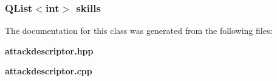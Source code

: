 \subsubsection{\setlength{\rightskip}{0pt plus 5cm}QList$<$int$>$ {\bf skills}}\label{classAttackDescriptor_o8}




The documentation for this class was generated from the following files:\begin{CompactItemize}
\item 
{\bf attackdescriptor.hpp}\item 
{\bf attackdescriptor.cpp}\end{CompactItemize}
